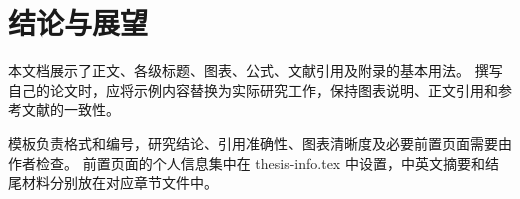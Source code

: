\chapter{结论与展望}
本文档展示了正文、各级标题、图表、公式、文献引用及附录的基本用法。
撰写自己的论文时，应将示例内容替换为实际研究工作，保持图表说明、正文引用和参考文献的一致性。

模板负责格式和编号，研究结论、引用准确性、图表清晰度及必要前置页面需要由作者检查。
前置页面的个人信息集中在 thesis-info.tex 中设置，中英文摘要和结尾材料分别放在对应章节文件中。
